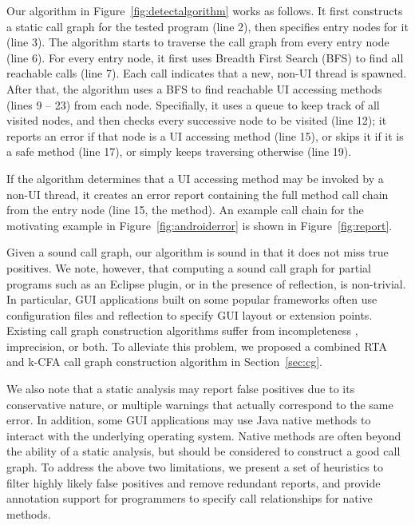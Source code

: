 Our algorithm in Figure~\ref{fig:detectalgorithm} works as follows. It
first constructs a static call graph for the tested program (line 2),
then specifies entry nodes for it (line 3). The algorithm starts to traverse
the call graph from every entry node (line 6). For every entry node,
it first uses Breadth First Search (BFS) to find all reachable
 calls (line 7). Each  call
indicates that a new, non-UI thread is spawned.  After that, 
the algorithm uses a BFS to find reachable UI accessing methods (lines 9 -- 23)
from each  node.
Specifially, it uses a queue to keep track of all visited nodes, and
then checks every successive node to be visited (line 12);
it reports an error if that node
is a UI accessing method (line 15), or skips it if it is
a safe method (line 17), or simply keeps traversing otherwise (line 19).

If the algorithm determines that a UI accessing method may be invoked
by a non-UI thread, it creates an error report containing the full
method call chain from the entry node (line 15, the 
method). An example call chain for
the motivating example in Figure~\ref{fig:androiderror} is shown
in Figure~\ref{fig:report}.

Given a sound call graph, our algorithm is sound in that it does not
miss true positives. We note, however, that computing a sound
call graph for partial programs such as an Eclipse plugin,
or in the presence of reflection, is non-trivial. 
In particular, GUI applications built on some popular frameworks
often use configuration files and reflection to specify GUI layout
or extension points.
Existing call graph construction algorithms suffer from incompleteness
, imprecision, or both.  To alleviate this problem, 
we proposed a combined RTA
and k-CFA call graph construction algorithm in Section~\ref{sec:cg}.



We also note that a static analysis may report false positives due
to its conservative nature, or multiple warnings that actually correspond to
the same error. In addition, some GUI applications may use
Java native methods to interact with the underlying operating system.
Native methods are often beyond the ability of a static analysis, but
should be considered to construct a good call graph. To address the
above two limitations, we present a set of heuristics to filter
highly likely false positives and remove redundant reports, and provide
annotation support for programmers to specify call relationships for
 native methods.


